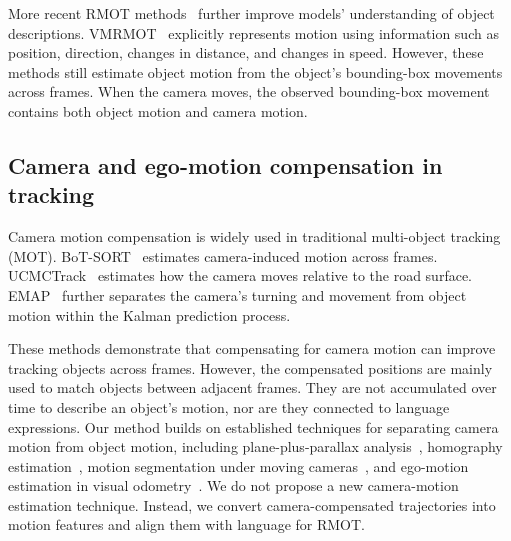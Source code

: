 \documentclass{article}
\begin{document}
More recent RMOT methods~\cite{mlstrack,deeprmot,cdrmot,tellmewhat} further improve models' understanding of object descriptions. VMRMOT~\cite{vmrmot} explicitly represents motion using information such as position, direction, changes in distance, and changes in speed. However, these methods still estimate object motion from the object's bounding-box movements across frames. When the camera moves, the observed bounding-box movement contains both object motion and camera motion. %


\subsection{Camera and ego-motion compensation in tracking}
Camera motion compensation is widely used in traditional multi-object tracking (MOT). BoT-SORT~\cite{botsort} estimates camera-induced motion across frames. UCMCTrack~\cite{ucmctrack} estimates how the camera moves relative to the road surface. EMAP~\cite{emap} further separates the camera's turning and movement from object motion within the Kalman prediction process.

These methods demonstrate that compensating for camera motion can improve tracking objects across frames. However, the compensated positions are mainly used to match objects between adjacent frames. They are not accumulated over time to describe an object's motion, nor are they connected to language expressions. Our method builds on established techniques for separating camera motion from object motion, including plane-plus-parallax analysis~\cite{iranianandan}, homography estimation~\cite{hartleyzisserman}, motion segmentation under moving cameras~\cite{bideau}, and ego-motion estimation in visual odometry~\cite{scaramuzza}. We do not propose a new camera-motion estimation technique. Instead, we convert camera-compensated trajectories into motion features and align them with language for RMOT.
\end{document}
